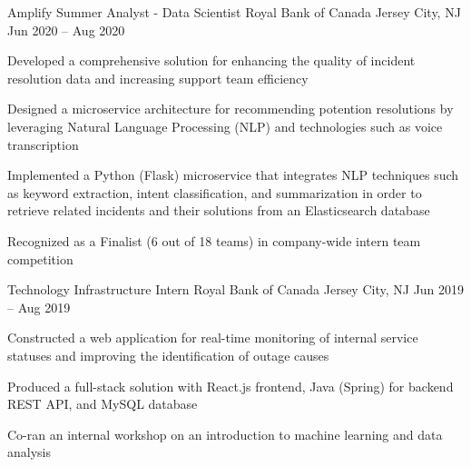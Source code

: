 

\begin{cventries}

  \cventry
	{Amplify Summer Analyst - Data Scientist}
	{Royal Bank of Canada}
	{Jersey City, NJ}
	{Jun 2020 – Aug 2020}
	{
    \begin{cvitems}
		  \item {Developed a comprehensive solution for enhancing the quality of incident resolution data and increasing support team efficiency}
		  \item {Designed a microservice architecture for recommending potention resolutions by leveraging Natural Language Processing (NLP) and technologies such as voice transcription}
		  \item {Implemented a Python (Flask) microservice that integrates NLP techniques such as keyword extraction, intent classification, and summarization in order to retrieve related incidents and their solutions from an Elasticsearch database}
		  \item {Recognized as a Finalist (6 out of 18 teams) in company-wide intern team competition}
    \end{cvitems}
  }
  
  
  \cventry
  {Technology Infrastructure Intern}
  {Royal Bank of Canada}
  {Jersey City, NJ}
  {Jun 2019 -- Aug 2019}
  {
    \begin{cvitems}
      \item {Constructed a web application for real-time monitoring of internal service statuses and improving the identification of outage causes}
      \item {Produced a full-stack solution with React.js frontend, Java (Spring) for backend REST API, and MySQL database}
      \item {Co-ran an internal workshop on an introduction to machine learning and data analysis}
    \end{cvitems}
  }



\end{cventries}
